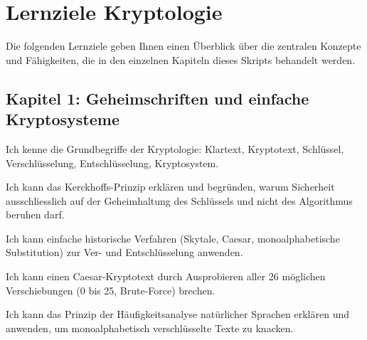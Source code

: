 \chapter{Lernziele Kryptologie}

Die folgenden Lernziele geben Ihnen einen Überblick über die zentralen Konzepte und Fähigkeiten, die in den einzelnen Kapiteln dieses Skripts behandelt werden.

\section*{Kapitel 1: Geheimschriften und einfache Kryptosysteme}
\begin{todolist}
  \item Ich kenne die Grundbegriffe der Kryptologie: Klartext, Kryptotext, Schlüssel, Verschlüsselung, Entschlüsselung, Kryptosystem.
  \item Ich kann das Kerckhoffs-Prinzip erklären und begründen, warum Sicherheit ausschliesslich auf der Geheimhaltung des Schlüssels und nicht des Algorithmus beruhen darf.
  \item Ich kann einfache historische Verfahren (Skytale, Caesar, monoalphabetische Substitution) zur Ver- und Entschlüsselung anwenden.
  \item Ich kann einen Caesar-Kryptotext durch Ausprobieren aller 26 möglichen Verschiebungen (0 bis 25, Brute-Force) brechen.
  \item Ich kann das Prinzip der Häufigkeitsanalyse natürlicher Sprachen erklären und anwenden, um monoalphabetisch verschlüsselte Texte zu knacken.
\end{todolist}

